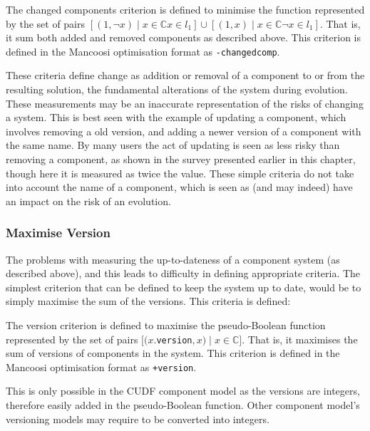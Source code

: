 \begin{defs}
	 The changed components criterion is defined to minimise the function
	represented by the set of pairs $[(1,\neg x) \mid x \in \mathbb{C} x \in l_1] \cup [(1,x) \mid x \in \mathbb{C} \neg x \in l_1]$.
	That is, it sum both added and removed components as described above.
	This criterion is defined in the Mancoosi optimisation format as \verb+-changedcomp+.
\end{defs}

These criteria define change as addition or removal of a component to or from the resulting solution, the fundamental alterations of the system during evolution.
These measurements may be an inaccurate representation of the risks of changing a system.
This is best seen with the example of updating a component, which involves removing a old version, and adding a newer version of a component with the same name.
By many users the act of updating is seen as less risky than removing a component, as shown in the survey presented earlier in this chapter,
though here it is measured as twice the value.
These simple criteria do not take into account the name of a component, which is seen as (and may indeed) have an impact on the risk of an evolution.

\subsubsection{Maximise Version}
The problems with measuring the up-to-dateness of a component system (as described above), and this leads to difficulty in defining appropriate criteria.
The simplest criterion that can be defined to keep the system up to date, would be to simply maximise the sum of the versions.
This criteria is defined:

\begin{defs}
	The version criterion is defined to maximise the pseudo-Boolean function 
	represented by the set of pairs $[(x$.\verb+version+$,x) \mid x \in \mathbb{C}]$.
	That is, it maximises the sum of versions of components in the system.
	This criterion is defined in the Mancoosi optimisation format as \verb!+version!.
\end{defs}

This is only possible in the CUDF component model as the versions are integers, therefore easily added in the pseudo-Boolean function.
Other component model's versioning models may require to be converted into integers.

